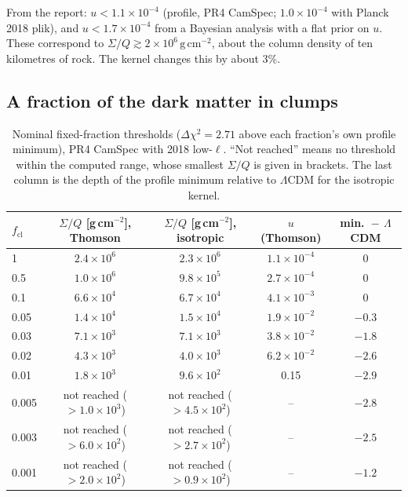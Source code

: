 \documentclass[11pt,a4paper]{article}
\newcommand{\cl}{\mathrm{cl}}
\newcommand{\dchi}{\Delta\chi^2}
\begin{document}
From the report: $u < 1.1\times10^{-4}$ (profile, PR4 CamSpec; $1.0\times10^{-4}$ with Planck 2018 plik), and $u < 1.7\times10^{-4}$ from a Bayesian analysis with a flat prior on $u$. These correspond to $\Sigma/Q \gtrsim 2\times10^{6}\,\mathrm{g\,cm^{-2}}$, about the column density of ten kilometres of rock. The kernel changes this by about 3\%.

\subsection{A fraction of the dark matter in clumps}

\begin{table}[t]
\centering
\small
\caption{Nominal fixed-fraction thresholds ($\dchi = 2.71$ above each fraction's own profile minimum), PR4 CamSpec with 2018 low-$\ell$. ``Not reached'' means no threshold within the computed range, whose smallest $\Sigma/Q$ is given in brackets. The last column is the depth of the profile minimum relative to $\Lambda$CDM for the isotropic kernel.}
\label{tab:thresholds}
\begin{tabular}{lcccc}
\toprule
$f_\cl$ & $\Sigma/Q$ [g\,cm$^{-2}$], Thomson & $\Sigma/Q$ [g\,cm$^{-2}$], isotropic & $u$ (Thomson) & min.\ $-$ $\Lambda$CDM \\
\midrule
1     & $2.4\times10^{6}$ & $2.3\times10^{6}$ & $1.1\times10^{-4}$ & 0 \\
0.5   & $1.0\times10^{6}$ & $9.8\times10^{5}$ & $2.7\times10^{-4}$ & 0 \\
0.1   & $6.6\times10^{4}$ & $6.7\times10^{4}$ & $4.1\times10^{-3}$ & 0 \\
0.05  & $1.4\times10^{4}$ & $1.5\times10^{4}$ & $1.9\times10^{-2}$ & $-0.3$ \\
0.03  & $7.1\times10^{3}$ & $7.1\times10^{3}$ & $3.8\times10^{-2}$ & $-1.8$ \\
0.02  & $4.3\times10^{3}$ & $4.0\times10^{3}$ & $6.2\times10^{-2}$ & $-2.6$ \\
0.01  & $1.8\times10^{3}$ & $9.6\times10^{2}$ & 0.15 & $-2.9$ \\
0.005 & not reached ($>1.0\times10^{3}$) & not reached ($>4.5\times10^{2}$) & -- & $-2.8$ \\
0.003 & not reached ($>6.0\times10^{2}$) & not reached ($>2.7\times10^{2}$) & -- & $-2.5$ \\
0.001 & not reached ($>2.0\times10^{2}$) & not reached ($>0.9\times10^{2}$) & -- & $-1.2$ \\
\bottomrule
\end{tabular}
\end{table}
\end{document}
